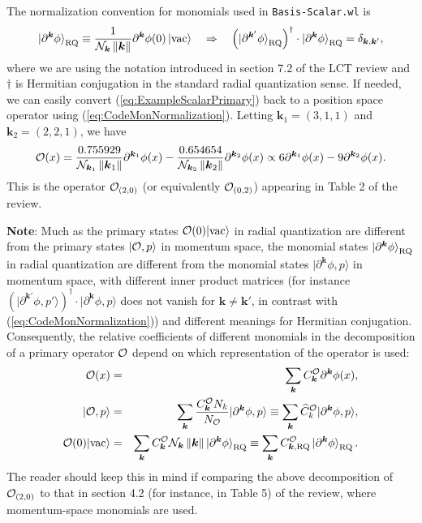 \documentclass[12pt]{article}
\def\>{\rangle}
\newcommand{\be}{\begin{eqnarray}}
\newcommand{\ee}{\end{eqnarray}}
\newcommand{\CN}{{\cal N}}
\newcommand{\CO}{{\cal O}}
\newcommand{\nn}{\nonumber}
\newcommand{\p}{\partial}
\newcommand{\bk}{\boldsymbol{k}}
\newcommand{\norm}[1]{\left\lVert#1\right\rVert}
\newcommand{\wh}{\widehat}
\newcommand{\rket}[1]{\ket{#1}_{\rm RQ}}
\newcommand{\kvec}{\boldsymbol{k}}
\begin{document}
The normalization convention for monomials used in {\tt Basis-Scalar.wl} is
\be
\rket{ \p^{\kvec} \phi } \equiv \frac{1}{\CN_{\kvec} \norm{\kvec} } \p^{\kvec}\phi(0) \ket{\rm vac}  \quad  \Rightarrow \quad \left( \rket{\p^{\bk'} \phi} \right)^\dagger \cdot \rket{\p^{\bk} \phi} = \delta_{\bk, \bk'}, 
\label{eq:CodeMonNormalization}
\ee
where we are using the notation introduced in section 7.2 of the LCT review and $\dagger$ is Hermitian conjugation in the standard radial quantization sense. %
If needed, we can easily convert (\ref{eq:ExampleScalarPrimary}) back to a position space operator using (\ref{eq:CodeMonNormalization}). Letting $\bk_1=(3,1,1)$ and $\bk_2 = (2,2,1)$, we have
\be
\CO(x) = \frac{0.755929}{\CN_{\kvec_1} \norm{\kvec_1}} \p^{\bk_1}\phi(x) - \frac{0.654654}{\CN_{\kvec_2} \norm{\kvec_2}} \p^{\bk_2}\phi(x) \propto  6 \p^{\bk_1}\phi(x) - 9 \p^{\bk_2}\phi(x).
\label{eq:ExamplePositionSpace}
\ee
This is the operator $\CO_{(2,0)}$ (or equivalently $\CO_{(0,2)}$) appearing in Table 2 of the review. 

{\bf Note}: Much as the primary states $\CO(0)| {\rm vac}\>$ in radial quantization are different from the primary states $|\CO, p\>$ in momentum space, the monomial states $\rket{ \p^{\kvec} \phi }$ in radial quantization are different from the monomial states $|\p^{\kvec} \phi, p\>$ in momentum space, with different inner product matrices (for instance $\left( | \p^{\kvec '} \phi, p' \> \right)^\dagger \cdot | \p^{\kvec} \phi, p \>$ does not vanish for $\kvec \ne \kvec'$, in contrast with (\ref{eq:CodeMonNormalization})) and different meanings for Hermitian conjugation.  Consequently, the relative coefficients of different monomials in the decomposition of a primary operator $\CO$ depend on which representation of the operator is used:
\be
\CO(x) &=& \sum_{\bk} C_{\bk}^{\CO} \p^{\bk} \phi(x) , \nn\\
| \CO, p \> &=&  \sum_{\bk} \frac{C_{\bk}^{\CO} N_k}{N_{\CO}} | \p^{\bk} \phi, p\> \equiv \sum_{\bk} \wh{C}_k^{\CO} | \p^{\bk} \phi, p \> , \nn\\
\CO(0) | \textrm{vac} \> &=& \sum_{\bk} C_{\bk}^{\CO} \CN_{\bk} \norm{\bk}  \rket{\p^{\bk} \phi} \equiv \sum_{\bk} C_{\bk, \rm RQ}^{\CO}  \rket{\p^{\bk} \phi}.
\label{eq:AllReps}
\ee
 The reader should keep this in mind if comparing the above decomposition of $\CO_{(2,0)}$ to that in section 4.2 (for instance, in Table 5) of the review, where momentum-space monomials are used.  
\end{document}
